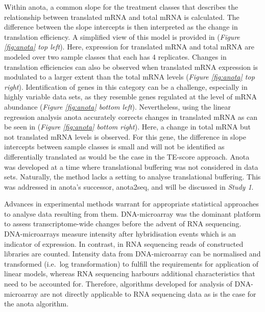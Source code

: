 \documentclass[
  12pt,
  openany]{book}
\begin{document}
Within anota, a common slope for the treatment classes that describes the relationship between translated mRNA and total mRNA is calculated. The difference between the slope intercepts is then interpreted as the change in translation efficiency. A simplified view of this model is provided in (\emph{Figure \ref{fig:anota} top left}). Here, expression for translated mRNA and total mRNA are modeled over two sample classes that each has 4 replicates. Changes in translation efficiencies can also be observed when translated mRNA expression is modulated to a larger extent than the total mRNA levels (\emph{Figure \ref{fig:anota} top right}). Identification of genes in this category can be a challenge, especially in highly variable data sets, as they resemble genes regulated at the level of mRNA abundance (\emph{Figure \ref{fig:anota} bottom left}). Nevertheless, using the linear regression analysis anota accurately corrects changes in translated mRNA as can be seen in (\emph{Figure \ref{fig:anota} bottom right}). Here, a change in total mRNA but not translated mRNA levels is observed. For this gene, the difference in slope intercepts between sample classes is small and will not be identified as differentially translated as would be the case in the TE-score approach. Anota was developed at a time where translational buffering was not considered in data sets. Naturally, the method lacks a setting to analyse translational buffering. This was addressed in anota's successor, anota2seq, and will be discussed in \emph{Study 1}.

Advances in experimental methods warrant for appropriate statistical approaches to analyse data resulting from them. DNA-microarray was the dominant platform to assess transcriptome-wide changes before the advent of RNA sequencing. DNA-microarrays measure intensity after hybridisation events which is an indicator of expression. In contrast, in RNA sequencing reads of constructed libraries are counted. Intensity data from DNA-microarray can be normalised and transformed (i.e.~log transformation) to fulfill the requirements for application of linear models, whereas RNA sequencing harbours additional characteristics that need to be accounted for. Therefore, algorithms developed for analysis of DNA- microarray are not directly applicable to RNA sequencing data as is the case for the anota algorithm.
\end{document}
